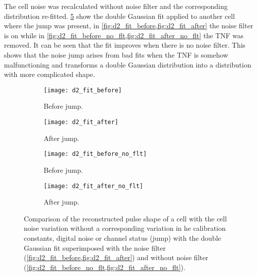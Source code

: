 The cell noise was recalculated without noise filter and the corresponding
distribution re-fitted. \cref{fig:no_filter_fit} show the double Gaussian fit
applied to another cell where the jump was present, in
\cref{fig:d2_fit_before,fig:d2_fit_after} the noise filter is on while in
\cref{fig:d2_fit_before_no_flt,fig:d2_fit_after_no_flt} the TNF was removed. It
can be seen that the fit improves when there is no noise filter. This shows that
the noise jump arises from bad fits when the TNF is somehow malfunctioning and
transforms a double Gaussian distribution into a distribution with more
complicated shape.
\begin{figure}[!h]
  \centering
  \begin{subfigure}[t]{.48\linewidth}
    \texttt{[image: d2\_fit\_before]}
    \caption{Before jump.}
    \label{fig:d2_fit_before}
  \end{subfigure}
  \begin{subfigure}[t]{.48\linewidth}
    \texttt{[image: d2\_fit\_after]}
    \caption{After jump.}
    \label{fig:d2_fit_after}
  \end{subfigure}

  \begin{subfigure}[t]{.48\linewidth}
    \texttt{[image: d2\_fit\_before\_no\_flt]}
    \caption{Before jump.}
    \label{fig:d2_fit_before_no_flt}
  \end{subfigure}
  \begin{subfigure}[t]{.48\linewidth}
    \texttt{[image: d2\_fit\_after\_no\_flt]}
    \caption{After jump.}
    \label{fig:d2_fit_after_no_flt}
  \end{subfigure}
  \caption{Comparison of the reconstructed pulse shape of a cell with the cell
    noise variation without a corresponding variation in he calibration
    constants, digital noise or channel status (jump) with the double Gaussian
    fit superimposed with the noise filter
    (\cref{fig:d2_fit_before,fig:d2_fit_after}) and without noise filter
    (\cref{fig:d2_fit_before_no_flt,fig:d2_fit_after_no_flt}).}
  \label{fig:no_filter_fit}
\end{figure}
